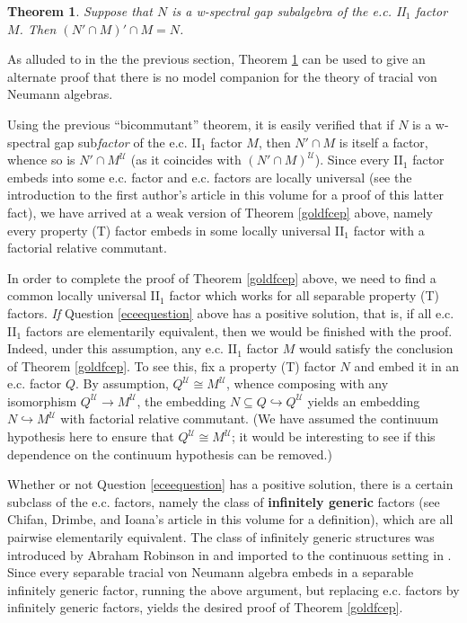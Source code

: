 \documentclass[12pt]{amsart}
\newtheorem{thm}{Theorem}[section]
\theoremstyle{definition}
\def\u{\mathsf 1}
\def \u{\mathcal U}
\begin{document}
\begin{thm}\label{bicomm}
Suppose that $N$ is a w-spectral gap subalgebra of the e.c. II$_1$ factor $M$.  Then $(N'\cap M)'\cap M=N$.
\end{thm}

As alluded to in the the previous section, Theorem \ref{bicomm} can be used to give an alternate proof that there is no model companion for the theory of tracial von Neumann algebras.

Using the previous ``bicommutant'' theorem, it is easily verified that if $N$ is a w-spectral gap sub\emph{factor} of the e.c. II$_1$ factor $M$, then $N'\cap M$ is itself a factor, whence so is $N'\cap M^\u$ (as it coincides with $(N'\cap M)^\u$).  Since every II$_1$ factor embeds into some e.c. factor and e.c. factors are locally universal (see the introduction to the first author's article in this volume for a proof of this latter fact), we have arrived at a weak version of Theorem \ref{goldfcep} above, namely every property (T) factor embeds in some locally universal II$_1$ factor with a factorial relative commutant.

In order to complete the proof of Theorem \ref{goldfcep} above, we need to find a common locally universal II$_1$ factor which works for all separable property (T) factors.  \emph{If} Question \ref{eceequestion} above has a positive solution, that is, if all e.c. II$_1$ factors are elementarily equivalent, then we would be finished with the proof. Indeed, under this assumption, any e.c. II$_1$ factor $M$ would satisfy the conclusion of Theorem \ref{goldfcep}.  To see this, fix a property (T) factor $N$ and embed it in an e.c. factor $Q$.  By assumption, $Q^\u\cong M^\u$, whence composing with any isomorphism $Q^\u\to M^\u$, the embedding $N\subseteq Q\hookrightarrow Q^\u$ yields an embedding $N\hookrightarrow M^\u$ with factorial relative commutant. (We have assumed the continuum hypothesis here to ensure that $Q^\u\cong M^\u$; it would be interesting to see if this dependence on the continuum hypothesis can be removed.)

Whether or not Question \ref{eceequestion} has a positive solution, there is a certain subclass of the e.c. factors, namely the class of \textbf{infinitely generic} factors (see Chifan, Drimbe, and Ioana's article in this volume for a definition), which are all pairwise elementarily equivalent.  The class of infinitely generic structures was introduced by Abraham Robinson in \cite{robinson} and imported to the continuous setting in \cite[Section 5]{ecfactors}.  Since every separable tracial von Neumann algebra embeds in a separable infinitely generic factor, running the above argument, but replacing e.c. factors by infinitely generic factors, yields the desired proof of Theorem \ref{goldfcep}.
\end{document}
